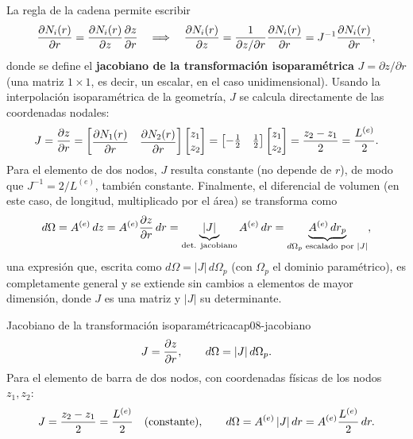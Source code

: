 La regla de la cadena permite escribir
\[
\pdv{N_i(r)}{r} = \pdv{N_i(r)}{z}\pdv{z}{r} \quad\Longrightarrow\quad \pdv{N_i(r)}{z} = \frac{1}{\partial z/\partial r}\pdv{N_i(r)}{r} = J^{-1}\pdv{N_i(r)}{r} ,
\]
donde se define el \textbf{jacobiano de la transformación isoparamétrica} $J=\partial z/\partial r$ (una matriz $1\times1$, es decir, un escalar, en el caso unidimensional). Usando la interpolación isoparamétrica de la geometría, $J$ se calcula directamente de las coordenadas nodales:
\[
J = \pdv{z}{r} = \begin{bmatrix}\dfrac{\partial N_1(r)}{\partial r} & \dfrac{\partial N_2(r)}{\partial r}\end{bmatrix}\begin{bmatrix}z_1\\z_2\end{bmatrix} = \begin{bmatrix}-\tfrac12 & \tfrac12\end{bmatrix}\begin{bmatrix}z_1\\z_2\end{bmatrix} = \frac{z_2-z_1}{2} = \frac{L^{(e)}}{2} .
\]
Para el elemento de dos nodos, $J$ resulta constante (no depende de $r$), de modo que $J^{-1}=2/L^{(e)}$, también constante. Finalmente, el diferencial de volumen (en este caso, de longitud, multiplicado por el área) se transforma como
\[
d\Omega = A^{(e)}\,dz = A^{(e)}\pdv{z}{r}\,dr = \underbrace{\abs{J}}_{\text{det. jacobiano}} A^{(e)}\, dr = \underbrace{A^{(e)}\,dr_p}_{d\Omega_p \text{ escalado por } |J|} ,
\]
una expresión que, escrita como $d\Omega = |J|\,d\Omega_p$ (con $\Omega_p$ el dominio paramétrico), es completamente general y se extiende sin cambios a elementos de mayor dimensión, donde $J$ es una matriz y $|J|$ su determinante.

\begin{ecnimportante}{Jacobiano de la transformación isoparamétrica}{cap08-jacobiano}
\[
J = \pdv{z}{r}, \qquad d\Omega = \abs{J}\, d\Omega_p .
\]
Para el elemento de barra de dos nodos, con coordenadas físicas de los nodos $z_1,z_2$:
\[
J = \frac{z_2-z_1}{2} = \frac{L^{(e)}}{2} \quad (\text{constante}), \qquad d\Omega = A^{(e)}\,\abs{J}\,dr = A^{(e)}\frac{L^{(e)}}{2}\,dr .
\]
\end{ecnimportante}

